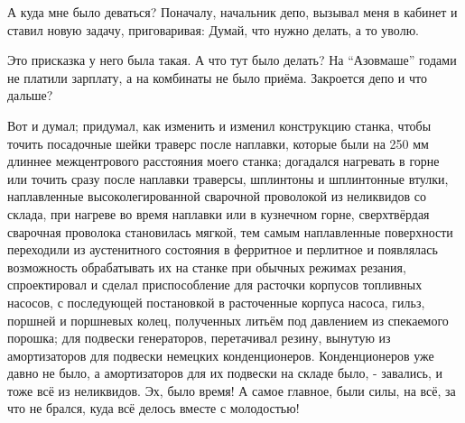 А куда мне было деваться? Поначалу, начальник депо, вызывал меня в кабинет и
ставил новую задачу, приговаривая: Думай, что нужно делать, а то уволю.

Это присказка у него была такая. А что тут было делать? На \enquote{Азовмаше} годами не
платили зарплату, а на комбинаты не было приёма. Закроется депо и что дальше?

Вот и думал; придумал, как изменить и изменил конструкцию станка, чтобы точить
посадочные шейки траверс после наплавки, которые были на 250 мм длиннее
межцентрового расстояния моего станка; догадался нагревать в горне или точить
сразу после наплавки траверсы, шплинтоны и шплинтонные втулки, наплавленные
высоколегированной сварочной проволокой из неликвидов со склада, при нагреве во
время наплавки или в кузнечном горне, сверхтвёрдая сварочная проволока
становилась мягкой, тем самым наплавленные поверхности переходили из
аустенитного состояния в ферритное и перлитное и появлялась возможность
обрабатывать их на станке при обычных режимах резания, спроектировал и сделал
приспособление для расточки корпусов топливных насосов, с последующей
постановкой в расточенные корпуса насоса, гильз, поршней и поршневых колец,
полученных литьём под давлением из спекаемого порошка; для подвески
генераторов, перетачивал резину, вынутую из амортизаторов для подвески немецких
конденционеров. Конденционеров уже давно не было, а амортизаторов для их
подвески на складе было, - завались, и тоже всё из неликвидов. Эх, было время!
А самое главное, были силы, на всё, за что не брался, куда всё делось вместе с
молодостью!

